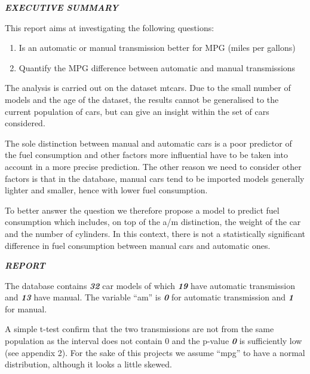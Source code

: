 \documentclass[]{article}
\title{}
\author{}
\date{}
\begin{document}
\maketitle


\textbf{\emph{EXECUTIVE SUMMARY}}

This report aims at investigating the following questions:

\begin{enumerate}
\def\labelenumi{\arabic{enumi}.}
\itemsep1pt\parskip0pt
\item
  Is an automatic or manual transmission better for MPG (miles per
  gallons)\\
\item
  Quantify the MPG difference between automatic and manual transmissions
\end{enumerate}

The analysis is carried out on the dataset mtcars. Due to the small
number of models and the age of the dataset, the results cannot be
generalised to the current population of cars, but can give an insight
within the set of cars considered.

The sole distinction between manual and automatic cars is a poor
predictor of the fuel consumption and other factors more influential
have to be taken into account in a more precise prediction. The other
reason we need to consider other factors is that in the database, manual
cars tend to be imported models generally lighter and smaller, hence
with lower fuel consumption.

To better answer the question we therefore propose a model to predict
fuel consumption which includes, on top of the a/m distinction, the
weight of the car and the number of cylinders. In this context, there is
not a statistically significant difference in fuel consumption between
manual cars and automatic ones.

\textbf{\emph{REPORT}}

The database contains \textbf{\emph{32}} car models of which
\textbf{\emph{19}} have automatic transmission and \textbf{\emph{13}}
have manual. The variable ``am'' is \textbf{\emph{0}} for automatic
transmission and \textbf{\emph{1}} for manual.

A simple t-test confirm that the two transmissions are not from the same
population as the interval does not contain 0 and the p-value
\textbf{\emph{0}} is sufficiently low (see appendix 2). For the sake of
this projects we assume ``mpg'' to have a normal distribution, although
it looks a little skewed.
\end{document}
